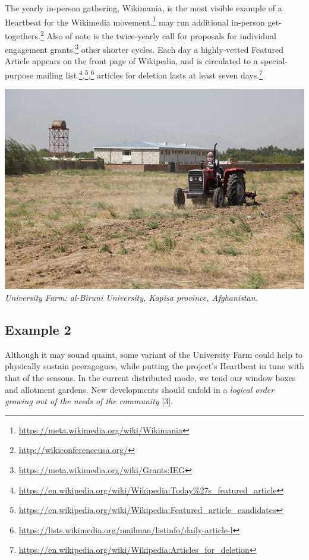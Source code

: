The yearly in-person gathering, Wikimania, is the most visible example
of a {{Heartbeat}} for the Wikimedia movement.\footnote{\url{https://meta.wikimedia.org/wiki/Wikimania}}
may run additional in-person get-togethers.\footnote{\url{http://wikiconferenceusa.org/}}
Also of note is the twice-yearly call for proposals for individual
engagement grants.\footnote{\url{https://meta.wikimedia.org/wiki/Grants:IEG}}
other shorter cycles. Each day a highly-vetted Featured Article appears
on the front page of Wikipedia, and is circulated to a special-purpose
mailing list.\footnote{\url{https://en.wikipedia.org/wiki/Wikipedia:Today\%27s_featured_article}},\footnote{\url{https://en.wikipedia.org/wiki/Wikipedia:Featured_article_candidates}},\footnote{\url{https://lists.wikimedia.org/mailman/listinfo/daily-article-l}}
articles for deletion lasts at least seven days.\footnote{\url{https://en.wikipedia.org/wiki/Wikipedia:Articles_for_deletion}}

\includegraphics{images/kapisa.jpg}\\
\emph{University Farm: al-Biruni University, Kapisa province,
Afghanistan.}

\hypertarget{example-2}{%
\subsection{Example 2}\label{example-2}}

Although it may sound quaint, some variant of the University Farm could
help to physically sustain peeragogues, while putting the project's
{{Heartbeat}} in tune with that of the seasons. In the current
distributed mode, we tend our window boxes and allotment gardens. New
developments should unfold in a \emph{logical order growing out of the
needs of the community} {{[}3{]}}.

